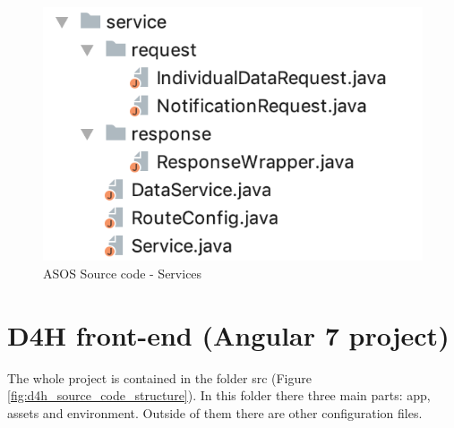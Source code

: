 \documentclass[a4paper, hidelinks, 12pt]{report}
\begin{document}
	\begin{figure}[H]
		\centering
		\includegraphics[scale=0.6]{images/backend/asos_source_code_services.png}
		\caption[ASOS Source code - Services]{ASOS Source code - Services}
		\label{fig:asos_source_code_services}
	\end{figure}


\section{D4H front-end (Angular 7 project)}
The whole project is contained in the folder src (Figure \ref{fig:d4h_source_code_structure}). In this folder there three main parts: app, assets and environment. Outside of them there are other configuration files.
\end{document}
